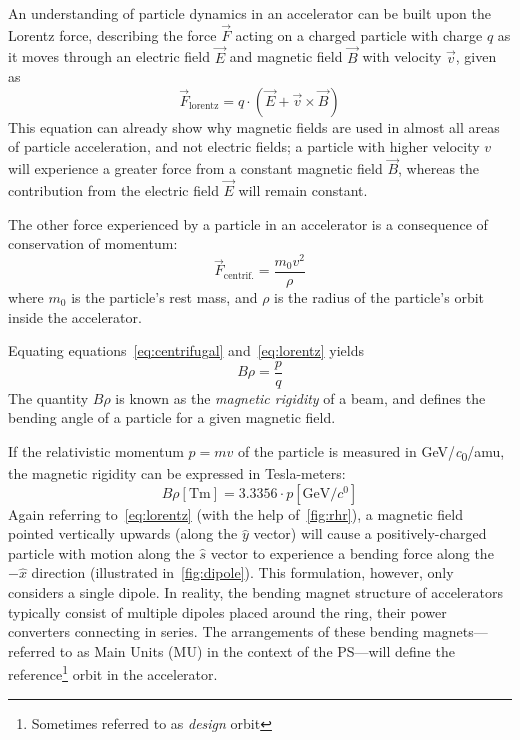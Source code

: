 \documentclass[11pt]{report}
\begin{document}
An understanding of particle dynamics in an accelerator can be built upon the Lorentz force, describing the force $\vec F$ acting on a charged particle with charge $q$ as it moves through an electric field $\vec E$ and magnetic field $\vec B$ with velocity $\vec v$, given as
\begin{equation}
\vec F_{\text{lorentz}} = q\cdot(\vec E+ \vec v\times\vec B)\label{eq:lorentz}
\end{equation}
This equation can already show why magnetic fields are used in almost all areas of particle acceleration, and not electric fields; a particle with higher velocity $v$ will experience a greater force from a constant magnetic field $\vec B$, whereas the contribution from the electric field $\vec E$ will remain constant.

The other force experienced by a particle in an accelerator is a consequence of conservation of momentum:
\begin{equation}
\vec F_{\text{centrif.}}=\frac{m_0v^2}{\rho}\label{eq:centrifugal}
\end{equation} where $m_0$ is the particle's rest mass, and $\rho$ is the radius of the particle's orbit inside the accelerator.

Equating equations~\ref{eq:centrifugal} and~\ref{eq:lorentz} yields
\begin{equation}
B\rho=\frac pq
\label{eq:brho}
\end{equation}
The quantity $B\rho$ is known as the \textit{magnetic rigidity} of a beam, and defines the bending angle of a particle for a given magnetic field. 

If the relativistic momentum $p=mv$ of the particle is measured in \unit[per-mode = symbol]{\GeV\per\clight\per amu}, the magnetic rigidity can be expressed in Tesla-meters:
\begin{equation}
B\rho \left[\unit{\tesla\meter}\right] = 3.3356\cdot p\left[\unit{\giga\electronvolt\per\clight}\right]
\label{tesla-meters}
\end{equation} %
Again referring to~\autoref{eq:lorentz} (with the help of~\autoref{fig:rhr}), a magnetic field pointed vertically upwards (along the $\hat y$ vector) will cause a positively-charged particle with motion along the $\hat s$ vector to experience a bending force along the $-\hat x$ direction (illustrated in~\autoref{fig:dipole}). This formulation, however, only considers a single dipole. In reality, the bending magnet structure of accelerators typically consist of multiple dipoles placed around the ring, their power converters connecting in series. The arrangements of these bending magnets---referred to as Main Units (MU) in the context of the PS---will define the reference\footnote{Sometimes referred to as \textit{design} orbit} orbit in the accelerator.
\end{document}

